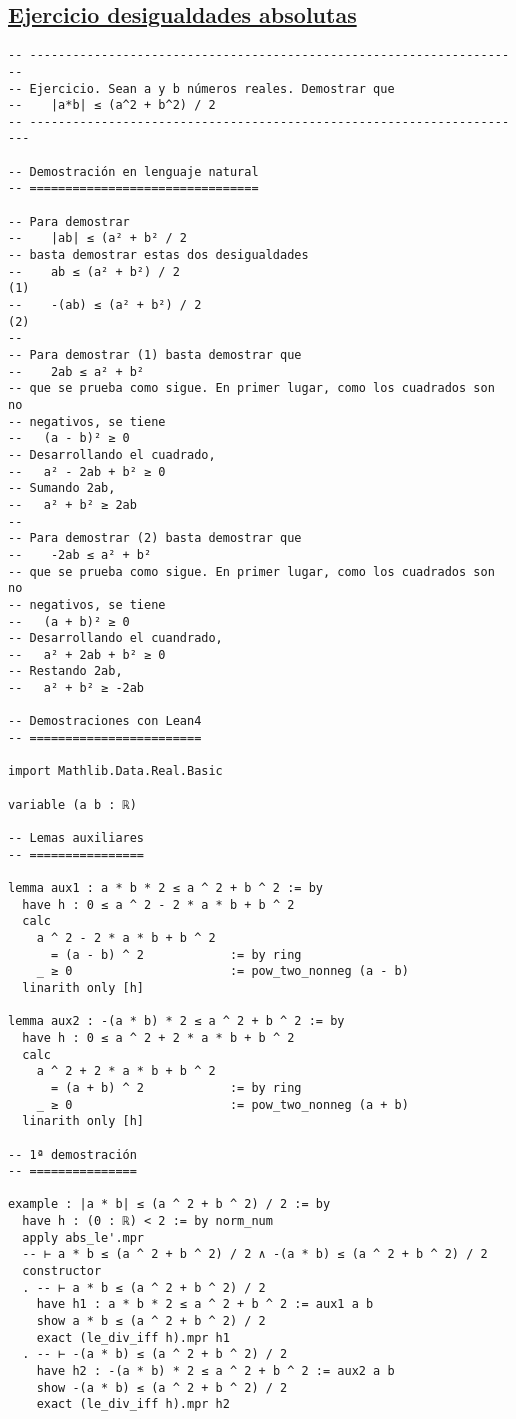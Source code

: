 \subsection{\href{./src/Basicos/Ejercicio\_desigualdades\_absolutas.lean}{Ejercicio desigualdades absolutas}}
\label{sec:org998215c}
\begin{verbatim}
-- ---------------------------------------------------------------------
-- Ejercicio. Sean a y b números reales. Demostrar que
--    |a*b| ≤ (a^2 + b^2) / 2
-- ----------------------------------------------------------------------

-- Demostración en lenguaje natural
-- ================================

-- Para demostrar
--    |ab| ≤ (a² + b² / 2
-- basta demostrar estas dos desigualdades
--    ab ≤ (a² + b²) / 2                                              (1)
--    -(ab) ≤ (a² + b²) / 2                                           (2)
--
-- Para demostrar (1) basta demostrar que
--    2ab ≤ a² + b²
-- que se prueba como sigue. En primer lugar, como los cuadrados son no
-- negativos, se tiene
--   (a - b)² ≥ 0
-- Desarrollando el cuadrado,
--   a² - 2ab + b² ≥ 0
-- Sumando 2ab,
--   a² + b² ≥ 2ab
--
-- Para demostrar (2) basta demostrar que
--    -2ab ≤ a² + b²
-- que se prueba como sigue. En primer lugar, como los cuadrados son no
-- negativos, se tiene
--   (a + b)² ≥ 0
-- Desarrollando el cuandrado,
--   a² + 2ab + b² ≥ 0
-- Restando 2ab,
--   a² + b² ≥ -2ab

-- Demostraciones con Lean4
-- ========================

import Mathlib.Data.Real.Basic

variable (a b : ℝ)

-- Lemas auxiliares
-- ================

lemma aux1 : a * b * 2 ≤ a ^ 2 + b ^ 2 := by
  have h : 0 ≤ a ^ 2 - 2 * a * b + b ^ 2
  calc
    a ^ 2 - 2 * a * b + b ^ 2
      = (a - b) ^ 2            := by ring
    _ ≥ 0                      := pow_two_nonneg (a - b)
  linarith only [h]

lemma aux2 : -(a * b) * 2 ≤ a ^ 2 + b ^ 2 := by
  have h : 0 ≤ a ^ 2 + 2 * a * b + b ^ 2
  calc
    a ^ 2 + 2 * a * b + b ^ 2
      = (a + b) ^ 2            := by ring
    _ ≥ 0                      := pow_two_nonneg (a + b)
  linarith only [h]

-- 1ª demostración
-- ===============

example : |a * b| ≤ (a ^ 2 + b ^ 2) / 2 := by
  have h : (0 : ℝ) < 2 := by norm_num
  apply abs_le'.mpr
  -- ⊢ a * b ≤ (a ^ 2 + b ^ 2) / 2 ∧ -(a * b) ≤ (a ^ 2 + b ^ 2) / 2
  constructor
  . -- ⊢ a * b ≤ (a ^ 2 + b ^ 2) / 2
    have h1 : a * b * 2 ≤ a ^ 2 + b ^ 2 := aux1 a b
    show a * b ≤ (a ^ 2 + b ^ 2) / 2
    exact (le_div_iff h).mpr h1
  . -- ⊢ -(a * b) ≤ (a ^ 2 + b ^ 2) / 2
    have h2 : -(a * b) * 2 ≤ a ^ 2 + b ^ 2 := aux2 a b
    show -(a * b) ≤ (a ^ 2 + b ^ 2) / 2
    exact (le_div_iff h).mpr h2


\end{verbatim}
